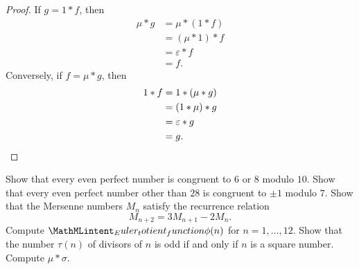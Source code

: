 \begin{proof}
  If $g=1\ast f$, then
  \begin{align*}
    \mu\ast g & = \mu\ast(1\ast f) \\
              & = (\mu\ast 1)\ast f \\
              & = \varepsilon \ast f \\
              & = f.
  \end{align*}
  Conversely, if $f=\mu\ast g$, then
  \begin{align*}
    1\ast f & = 1\ast(\mu\ast g) \\
            & = (1 \ast \mu)\ast g \\
            & = \varepsilon \ast g \\
            & = g.\qedhere
  \end{align*}
\end{proof}

\exercises

\begin{starter}
  \exercise Show that every even perfect number is congruent to $6$ or $8$ modulo $10$.
  \exercise Show that every even perfect number other than $28$ is congruent to $\pm 1$ modulo $7$.
  \exercise \label{exercise:mersenne-lucas-sequence}Show that the Mersenne numbers $M_n$ satisfy the recurrence relation
  \begin{equation*}
    M_{n+2}=3M_{n+1}-2M_n.
  \end{equation*}
  \exercise Compute $\totient(n)$ for $n=1,\ldots,12$.
  \exercise Show that the number $\tau(n)$ of divisors of $n$ is odd if and only if $n$ is a square number.
  \exercise Compute $\mu\ast\sigma$. %
\end{starter}

